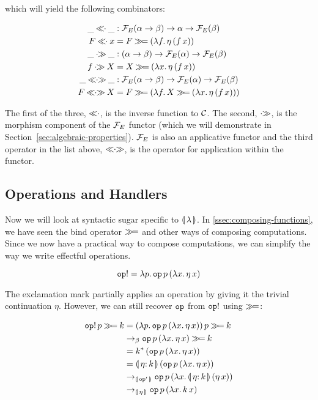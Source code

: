 which will yield the following combinators:

\begin{align*}
  \_ \apl \_ &: \FF_E(\alpha \to \beta) \to \alpha \to \FF_E(\beta) \\
  F \apl x &= F \hsbind (\lam{f}{\ap{\eta}{(\ap{f}{x})}}) \\
  \_ \apr \_ &: (\alpha \to \beta) \to \FF_E(\alpha) \to \FF_E(\beta) \\
  f \apr X &= X \hsbind (\lam{x}{\ap{\eta}{(\ap{f}{x})}}) \\
  \_ \aplr \_ &: \FF_E(\alpha \to \beta) \to \FF_E(\alpha) \to \FF_E(\beta) \\
  F \aplr X &= F \hsbind (\lam{f}{X \hsbind (\lam{x}{\ap{\eta}{(\ap{f}{x})}})})
\end{align*}

The first of the three, $\mathbin{\ll\!\!\cdot}$, is the inverse function to $\mathcal{C}$. The
second, $\mathbin{\cdot\!\!\gg}$, is the morphism component of the $\mathcal{F}_E$ functor (which we
will demonstrate in Section~\ref{sec:algebraic-properties}). $\mathcal{F}_E$ is
also an applicative functor and the third operator in the list above,
$\mathbin{\ll\!\!\cdot\!\!\gg}$, is the operator for application within the functor.


\subsection{Operations and Handlers}
\label{ssec:operations-and-handlers}

Now we will look at syntactic sugar specific to ${\llparenthesis \, \lambda \, \rrparenthesis}$. In
\ref{ssec:composing-functions}, we have seen the bind operator $\mathbin{\gg\!=}$
and other ways of composing computations. Since we now have a practical way
to compose computations, we can simplify the way we write effectful
operations.

$$
\mathtt{op}! = \lambda p.\, \mathtt{op}\,p\,(\lambda x.\, \eta\,x)
$$

The exclamation mark partially applies an operation by giving it the
trivial continuation $\eta$. However, we can still recover $\mathtt{op}$ from
$\mathtt{op}!$ using $\mathbin{\gg\!=}$:

\begin{align*}
  \ap{\op{op}!}{p} \hsbind k
  &= \ap{(\lam{p}{\ap{\ap{\op{op}}{p}}{(\lam{x}{\etaE{x}})}})}{p} \hsbind k \\
  &\to_{\beta} \ap{\ap{\op{op}}{p}}{(\lam{x}{\etaE{x}})} \hsbind k \\
  &= \ap{k^*}{(\ap{\ap{\op{op}}{p}}{(\lam{x}{\etaE{x}})})} \\
  &= \ap{\banana{\onto{\eta}{k}}}{(\ap{\ap{\op{op}}{p}}{(\lam{x}{\etaE{x}})})} \\
  &\to_{\banana{\op{op}'}} \ap{\ap{\op{op}}{p}}{(\lam{x}{\ap{\banana{\onto{\eta}{k}}}{(\ap{\eta}{x})}})} \\
  &\to_{\banana{\eta}} \ap{\ap{\op{op}}{p}}{(\lam{x}{\ap{k}{x}})}
\end{align*}

